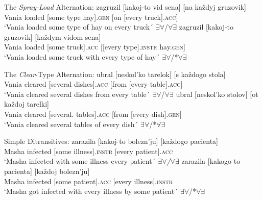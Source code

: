 \documentclass[output=paper,colorlinks,citecolor=brown]{./langscibook}
\begin{document}
\ea%
    \label{ex:antonyuk:4}
    The \textit{Spray-Load} Alternation:
    \ea \label{ex:antonyuk:4a}
     {zagruzil} {[kakoj-to}    {vid}   {sena]}       {[na}  {každyj} {gruzovik]}\\
    Vania loaded   [some   type hay].\textsc{gen} [on [every  truck].\textsc{acc}]\\
    \glt `Vania loaded some type of hay on every truck´ \hfill ${\exists}{\forall}$/${\forall}{\exists}$
    \ex \label{ex:antonyuk:4b}
     {zagruzil} {[kakoj-to} {gruzovik]}    {[každym} {vidom}          {sena]}\\
    Vania loaded  [some       truck].\textsc{acc} [[every    type].\textsc{instr}  hay.\textsc{gen}]\\
    \glt `Vania loaded some truck with every type of hay´ \hfill ${\exists}{\forall}$/*${\forall}{\exists}$
    \z
\z



\ea%
    \label{ex:antonyuk:5}
    The \textit{Clear}-Type Alternation: 
    \ea \label{ex:antonyuk:5a}
     {ubral}    {[neskol’ko}  {tarelok]}      {[s}        {každogo} {stola]}\\
    Vania cleared [several      dishes].\textsc{acc} [from [every      table].\textsc{acc]}\\
    \glt `Vania cleared several dishes from every table´ \hfill ${\exists}{\forall}$/${\forall}{\exists}$
    \ex \label{ex:antonyuk:5b}
     {ubral}   {[neskol’ko} {stolov]}      {[ot}    {každoj} {tarelki]}\\
    Vania cleared [several.     tables].\textsc{acc}  [from  [every  dish].\textsc{gen}]\\
    \glt `Vania cleared several tables of every dish´ \hfill ${\exists}{\forall}$/*${\forall}{\exists}$
    \z
\z


\ea%
    \label{ex:antonyuk:6}
    Simple Ditransitives:
    \ea \label{ex:antonyuk:6a}
       {zarazila} {[kakoj-to} {bolezn’ju]}  {[každogo} {pacienta]}\\
    Masha infected [some      illness].\textsc{instr}   [every     patient].\textsc{acc}\\
    \glt `Masha infected with some illness every patient´ \hfill \textit{${\exists}{\forall}$/${\forall}{\exists}$}
    \ex \label{ex:antonyuk:6b}
       {zarazila} {[kakogo-to} {pacienta]}   {[každoj} {bolezn’ju]}\\
    Masha infected [some         patient].\textsc{acc}   [every  illness].\textsc{instr}\\
    \glt `Masha got infected with every illness by some patient´ \hfill ${\exists}{\forall}$/*${\forall}{\exists}$
    \z
\z
\end{document}
